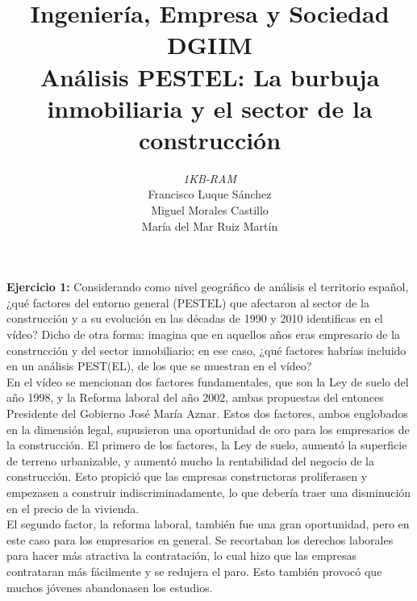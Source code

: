 \documentclass[11pt]{article}
\theoremstyle{plain}
\theoremstyle{definition}
\begin{document}
\title{Ingeniería, Empresa y Sociedad \\
  DGIIM \\
  \large Análisis PESTEL: La burbuja inmobiliaria y el sector de la
  construcción}
\author{\textit{1KB-RAM}\\
  Francisco Luque Sánchez\\
  Miguel Morales Castillo\\
  María del Mar Ruiz Martín}

\maketitle

\textbf{Ejercicio 1:} Considerando como nivel geográfico de análisis
el territorio español, ¿qué factores del entorno general (PESTEL) que
afectaron al sector de la construcción y a su evolución en las décadas
de 1990 y 2010 identificas en el vídeo? Dicho de otra forma: imagina
que en aquellos años eras empresario de la construcción y del sector
inmobiliario; en ese caso, ¿qué factores habrías incluido en un
análisis PEST(EL), de los que se muestran en el vídeo?\\

En el vídeo se mencionan dos factores fundamentales, que son la Ley de
suelo del año 1998, y la Reforma laboral del año 2002, ambas
propuestas del entonces Presidente del Gobierno José María
Aznar. Estos dos factores, ambos englobados en la dimensión legal,
supusieron una oportunidad de oro para los empresarios de la
construcción. El primero de los factores, la Ley de suelo, aumentó la
superficie de terreno urbanizable, y aumentó mucho la rentabilidad del
negocio de la construcción. Esto propició que las empresas
constructoras proliferasen y empezasen a construir
indiscriminadamente, lo que debería
traer una disminución en el precio de la vivienda.\\

El segundo factor, la reforma laboral, también fue una gran
oportunidad, pero en este caso para los empresarios en general. Se
recortaban los derechos laborales para hacer más atractiva la
contratación, lo cual hizo que las empresas contrataran más fácilmente
y se redujera el paro. Esto también provocó que muchos jóvenes
abandonasen los estudios. \\
\end{document}
